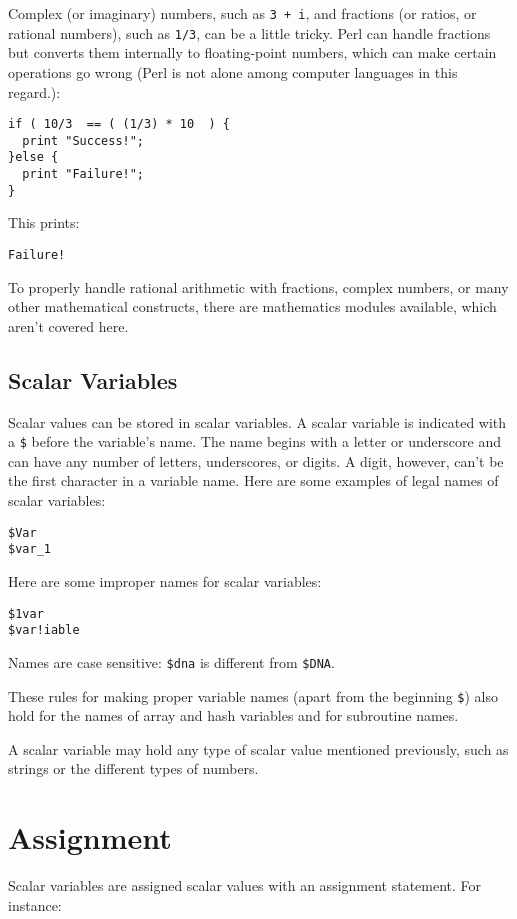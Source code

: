 Complex (or imaginary) numbers, such as \verb|3 + i|, and fractions (or ratios, or rational numbers), such as \verb|1/3|, can be a little tricky. Perl can handle fractions but converts them internally to floating-point numbers, which can make certain operations go wrong (Perl is not alone among computer languages in this regard.):

\begin{lstlisting}
if ( 10/3  == ( (1/3) * 10  ) {
  print "Success!";
}else {
  print "Failure!";
}
\end{lstlisting}

This prints:

\begin{lstlisting}
Failure!
\end{lstlisting}

To properly handle rational arithmetic with fractions, complex numbers, or many other mathematical constructs, there are mathematics modules available, which aren't covered here.

\subsection{Scalar Variables}
Scalar values can be stored in scalar variables. A scalar variable is indicated with a \verb|$| before the variable's name. The name begins with a letter or underscore and can have any number of letters, underscores, or digits. A digit, however, can't be the first character in a variable name. Here are some examples of legal names of scalar variables:

\begin{lstlisting}
$Var
$var_1
\end{lstlisting}

Here are some improper names for scalar variables:

\begin{lstlisting}
$1var
$var!iable
\end{lstlisting}

Names are case sensitive: \verb|$dna| is different from \verb|$DNA|.

These rules for making proper variable names (apart from the beginning \verb|$|) also hold for the names of array and hash variables and for subroutine names.

A scalar variable may hold any type of scalar value mentioned previously, such as strings or the different types of numbers.

\section{Assignment}
Scalar variables are assigned scalar values with an assignment statement. For instance:

